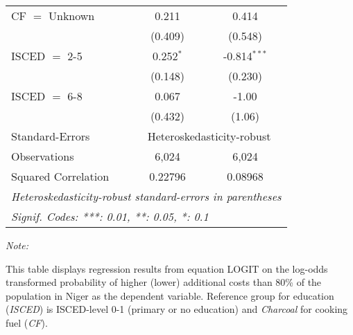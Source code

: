 \begin{table}[htbp!]
\begin{adjustbox}{width = 1\textwidth, max height = 0.95\textheight, center}
\begin{threeparttable}[b]
\begin{tabular}{lcc}
            CF $=$ Unknown       & 0.211         & 0.414\\   
                                 & (0.409)       & (0.548)\\   
            ISCED $=$ 2-5        & 0.252$^{*}$   & -0.814$^{***}$\\   
                                 & (0.148)       & (0.230)\\   
            ISCED $=$ 6-8        & 0.067         & -1.00\\   
                                 & (0.432)       & (1.06)\\   
            \midrule 
            Standard-Errors & \multicolumn{2}{c}{Heteroskedasticity-robust} \\ 
            Observations         & 6,024         & 6,024\\  
            Squared Correlation  & 0.22796       & 0.08968\\  
            \midrule \midrule
            \multicolumn{3}{l}{\emph{Heteroskedasticity-robust standard-errors in parentheses}}\\
            \multicolumn{3}{l}{\emph{Signif. Codes: ***: 0.01, **: 0.05, *: 0.1}}\\
         \end{tabular}
         
         \begin{tablenotes}\item \medskip \textit{Note:}
            \item This table displays regression results from equation LOGIT on the log-odds transformed probability of higher (lower) additional costs than 80\% of the population in Niger as the dependent variable. Reference group for education (\textit{ISCED}) is ISCED-level 0-1 (primary or no education) and \textit{Charcoal} for cooking fuel (\textit{CF}).
         \end{tablenotes}
      \end{threeparttable}
   \end{adjustbox}
\end{table}


